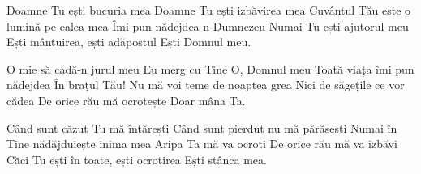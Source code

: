 
\beginverse
Doamne Tu ești bucuria mea
Doamne Tu ești izbăvirea mea
Cuvântul Tău este o lumină pe calea mea
Îmi pun nădejdea-n Dumnezeu
Numai Tu ești ajutorul meu
Ești mântuirea, ești adăpostul
Ești Domnul meu.
\endverse

\beginchorus
O mie să cadă-n jurul meu
Eu merg cu Tine O, Domnul meu
Toată viața îmi pun nădejdea
În brațul Tău!
Nu mă voi teme de noaptea grea
Nici de săgețile ce vor cădea
De orice rău mă ocrotește
Doar mâna Ta.
\endchorus

\beginverse
Când sunt căzut Tu mă întărești
Când sunt pierdut nu mă părăsești
Numai în Tine nădăjduiește inima mea
Aripa Ta mă va ocroti
De orice rău mă va izbăvi
Căci Tu ești în toate, ești ocrotirea
Ești stânca mea.
\endverse

\endsong